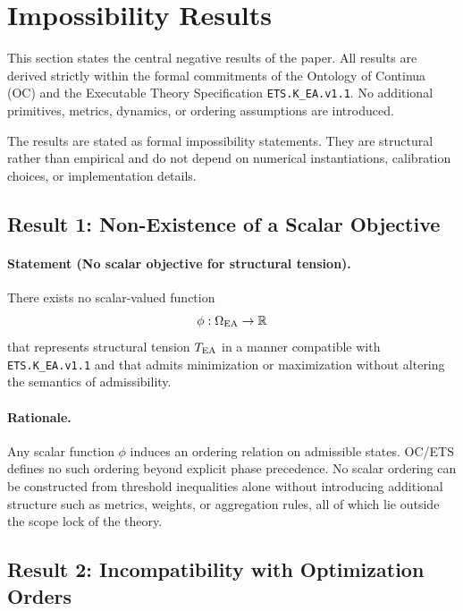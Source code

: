 ﻿%

\section{Impossibility Results}

This section states the central negative results of the paper.
All results are derived strictly within the formal commitments of the
Ontology of Continua (OC) and the Executable Theory Specification
\texttt{ETS.K\_EA.v1.1}. No additional primitives, metrics, dynamics, or
ordering assumptions are introduced.

The results are stated as formal impossibility statements. They are
structural rather than empirical and do not depend on numerical
instantiations, calibration choices, or implementation details.

\subsection{Result 1: Non-Existence of a Scalar Objective}

\paragraph{Statement (No scalar objective for structural tension).}
There exists no scalar-valued function
\[
\phi : \Omega_{\mathrm{EA}} \rightarrow \mathbb{R}
\]
that represents structural tension $T_{\mathrm{EA}}$ in a manner compatible with
\texttt{ETS.K\_EA.v1.1} and that admits minimization or maximization
without altering the semantics of admissibility.

\paragraph{Rationale.}
Any scalar function $\phi$ induces an ordering relation on admissible
states. OC/ETS defines no such ordering beyond explicit phase precedence.
No scalar ordering can be constructed from threshold inequalities alone
without introducing additional structure such as metrics, weights, or
aggregation rules, all of which lie outside the scope lock of the theory.

\subsection{Result 2: Incompatibility with Optimization Orders}

